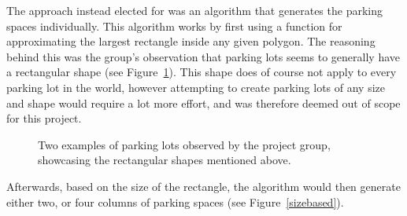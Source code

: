 The approach instead elected for was an algorithm that generates the parking spaces individually.
This algorithm works by first using a function for approximating the largest rectangle inside any given polygon. 
The reasoning behind this was the group's observation that parking lots seems to generally have a rectangular shape (see Figure~\ref{fig:parkings}).
This shape does of course not apply to every parking lot in the world, however attempting to create parking lots of any size and shape would require a lot more effort, and was therefore deemed out of scope for this project. 
\begin{figure}[H]
  \centering
  \begin{subfigure}[b]{0.56\textwidth}
  \end{subfigure}
  \quad
  \begin{subfigure}[b]{0.395\textwidth}
  \end{subfigure}

  \caption{Two examples of parking lots observed by the project group, showcasing the rectangular shapes mentioned above.}
  \label{fig:parkings}
\end{figure}
Afterwards, based on the size of the rectangle, the algorithm would then generate either two, or four columns of parking spaces (see Figure~\ref{sizebased}).
